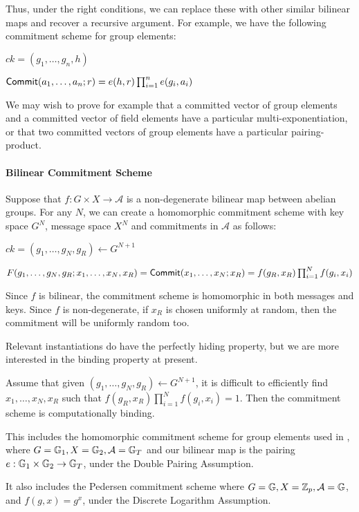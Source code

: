 Thus, under the right conditions, we can replace these with other similar bilinear maps and recover a recursive argument. For example, we have the following commitment scheme for group elements:

$ck = (g_1,\ldots,g_n,h)$

$\mathsf{Commit} (a_1,\ldots,a_n;r) = e(h,r) \prod_{i=1}^n e(g_i,a_i)$

We may wish to prove for example that a committed vector of group elements and a committed vector of field elements have a particular multi-exponentiation, or that two committed vectors of group elements have a particular pairing-product.

\paragraph{Bilinear Commitment Scheme}

Suppose that $f : G \times X \to \mathcal{A}$ is a non-degenerate bilinear map between abelian groups. For any $N$, we can create a homomorphic commitment scheme with key space $G^N$, message space $X^N$ and commitments in $\mathcal{A}$ as follows:

$ck = (g_1,\ldots,g_N,g_R) \gets G^{N+1}$

$F(g_1,\ldots,g_N,g_R;x_1,\ldots,x_N,x_R) = \mathsf{Commit}  (x_1,\ldots,x_N;x_R) = f(g_R,x_R) \prod_{i=1}^N f(g_i,x_i)$

Since $f$ is bilinear, the commitment scheme is homomorphic in both messages and keys. Since $f$ is non-degenerate, if $x_R$ is chosen uniformly at random, then the commitment will be uniformly random too.

Relevant instantiations do have the perfectly hiding property, but we are more interested in the binding property at present.

\begin{lemma} 
Assume that given $(g_1,\ldots,g_N,g_R) \gets G^{N+1}$, it is difficult to efficiently find $x_1,\ldots,x_N,x_R$ such that $f(g_R,x_R) \prod_{i=1}^N f(g_i,x_i) = 1$. Then the commitment scheme is computationally binding.
\end{lemma}

This includes the homomorphic commitment scheme for group elements used in \cite{Groth11}, where $G = \mathbb{G}_1, X = \mathbb{G}_2, \mathcal{A} = \mathbb{G}_T$ and our bilinear map is the pairing $e : \mathbb{G}_1 \times \mathbb{G}_2 \to \mathbb{G}_T$, under the Double Pairing Assumption.

It also includes the Pedersen commitment scheme where $G = \mathbb{G}, X = \mathbb{Z}_p, \mathcal{A} = \mathbb{G}$, and $f(g,x) = g^x$, under the Discrete Logarithm Assumption.

